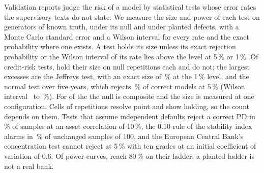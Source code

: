 Validation reports judge the risk of a model by statistical tests whose error rates the supervisory texts do not state.
We measure the size and power of each test on generators of known truth, under its null and under planted defects, with a Monte Carlo standard error and a Wilson interval for every rate and the exact probability where one exists.
A test holds its size unless its exact rejection probability or the Wilson interval of its rate lies above the level at 5\,\% or 1\,\%.
Of \nTests{} credit-risk tests, \nHold{} hold their size on \nRepsPooled{} null repetitions each and \nNotHold{} do not; the largest excesses are the Jeffreys test, with an exact size of \jeffExactOne\,\% at the 1\,\% level, and the normal test over five years, which rejects \pooledNorm\,\% of correct models at 5\,\% (Wilson interval \pooledNormLo\ to \pooledNormHi\,\%). For \nHoldOneConfig{} of the \nHold{} the null is composite and the size is measured at one configuration.
Cells of \nNullReps{} repetitions resolve \detIntFiveFour{} point and show \nHoldCellDef{} holding, so the count depends on them.
Tests that assume independent defaults reject a correct PD in \binRhoOneZeroExact\,\% of samples at an asset correlation of 10\,\%, the 0.10 rule of the stability index alarms in \psiHundred\,\% of unchanged samples of 100, and the European Central Bank's concentration test cannot reject at 5\,\% with ten grades at an initial coefficient of variation of 0.6.
Of \nPowerTests{} power curves, \nReach{} reach 80\,\% on their ladder; a planted ladder is not a real bank.

